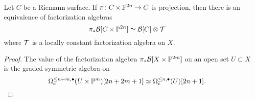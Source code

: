 \documentclass[11pt]{amsart}
\begin{document}
\begin{prop}
  Let $C$ be a Riemann surface.
  If $\pi \colon C \times \mathbb P^{2n} \to C$ is projection, then there is an equivalence of factorization algebras
\begin{equation}\label{eqn:bosoncompact}
\pi_{*} \mathcal B[C \times \mathbb P^{2n}] \simeq \mathcal B[C] \otimes \mathcal T
\end{equation}
where $\mathcal T$ is a locally constant factorization algebra on $X$.
\end{prop}
\begin{proof}
  The value of the factorization algebra $\pi_{*} \mathcal B[X \times \mathbb P^{2m}]$ on an open set $U \subset X$ is the graded symmetric algebra on
  \begin{equation}\label{}
\Omega_{c}^{\leq n+m, \bullet}(U \times \mathbb P^{m})[2n+2m+1] \simeq \Omega^{\leq n,\bullet}_{c}(U) [2n+1] .
  \end{equation}
\end{proof}
\end{document}

